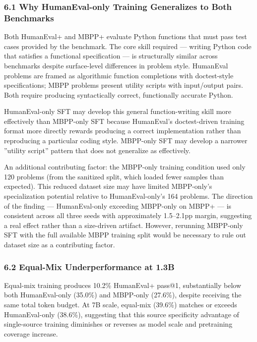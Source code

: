 
\subsubsection{6.1 Why HumanEval-only Training Generalizes to Both Benchmarks}

Both HumanEval+ and MBPP+ evaluate Python functions that must pass test cases provided by the benchmark. The core skill required --- writing Python code that satisfies a functional specification --- is structurally similar across benchmarks despite surface-level differences in problem style. HumanEval problems are framed as algorithmic function completions with doctest-style specifications; MBPP problems present utility scripts with input/output pairs. Both require producing syntactically correct, functionally accurate Python.

HumanEval-only SFT may develop this general function-writing skill more effectively than MBPP-only SFT because HumanEval's doctest-driven training format more directly rewards producing a correct implementation rather than reproducing a particular coding style. MBPP-only SFT may develop a narrower ''utility script'' pattern that does not generalize as effectively.

An additional contributing factor: the MBPP-only training condition used only 120 problems (from the sanitized split, which loaded fewer samples than expected). This reduced dataset size may have limited MBPP-only's specialization potential relative to HumanEval-only's 164 problems. The direction of the finding --- HumanEval-only exceeding MBPP-only on MBPP+ --- is consistent across all three seeds with approximately 1.5--2.1pp margin, suggesting a real effect rather than a size-driven artifact. However, rerunning MBPP-only SFT with the full available MBPP training split would be necessary to rule out dataset size as a contributing factor.

\subsubsection{6.2 Equal-Mix Underperformance at 1.3B}

Equal-mix training produces 10.2\% HumanEval+ pass@1, substantially below both HumanEval-only (35.0\%) and MBPP-only (27.6\%), despite receiving the same total token budget. At 7B scale, equal-mix (39.6\%) matches or exceeds HumanEval-only (38.6\%), suggesting that this source specificity advantage of single-source training diminishes or reverses as model scale and pretraining coverage increase.

